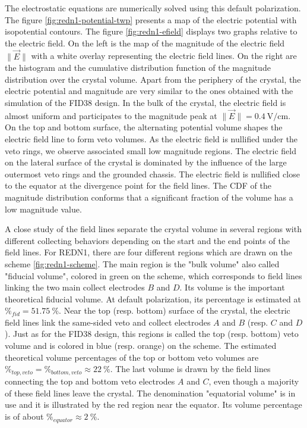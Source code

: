 The electrostatic equations are numerically solved using this default polarization. The figure \ref{fig:redn1-potential-twp} presents a map of the electric potential with isopotential contours. The  figure \ref{fig:redn1-efield} displays two graphs relative to the electric field. On the left is the map of the magnitude of the electric field $\| \vec{E} \|$ with a white overlay representing the electric field lines. On the right are the histogram and the cumulative distribution function of the magnitude distribution over the crystal volume.
Apart from the periphery of the crystal, the electric potential and magnitude are very similar to the ones obtained with the simulation of the FID38 design. In the bulk of the crystal, the electric field is almost uniform and participates to the magnitude peak at $\| \vec{E} \| = \SI{0.4}{\volt\per\centi\meter}$. 
On the top and bottom surface, the alternating potential volume shapes the electric field line to form veto volumes. As the electric field is nullified under the veto rings, we observe associated small low magnitude regions. 
The electric field on the lateral surface of the crystal is dominated by the influence of the large outermost veto rings and the grounded chassis. The electric field is nullified close to the equator at the divergence point for the field lines.
The CDF of the magnitude distribution conforms that a significant fraction of the volume has a low magnitude value.

A close study of the field lines separate the crystal volume in several regions with different collecting behaviors depending on the start and the end points of the field lines. For REDN1, there are four different regions which are drawn on the scheme \ref{fig:redn1-scheme}. 
The main region is the "bulk volume" also called "fiducial volume", colored in green on the scheme, which corresponds to field lines linking the two main collect electrodes $B$ and $D$. Its volume is the important theoretical fiducial volume. At default polarization, its percentage is estimated at $\%_{fid}=\SI{51.75}{\percent}$.
Near the top (resp. bottom) surface of the crystal, the electric field lines link the same-sided veto and collect electrodes $A$ and $B$ (resp. $C$ and $D$). Just as for the FID38 design, this regions is called the top (resp. bottom) veto volume and is colored in blue (resp. orange) on the scheme. The estimated theoretical volume percentages of the top or bottom veto volumes are $\%_{top,veto} = \%_{bottom,veto} \approx \SI{22}{\percent}$. 
The last volume is drawn by the field lines connecting the top and bottom veto electrodes $A$ and $C$, even though a majority of these field lines leave the crystal. The denomination "equatorial volume" is in use and it is illustrated by the red region near the equator. Its volume percentage is of about $\%_{equator} \approx \SI{2}{\percent}$.

